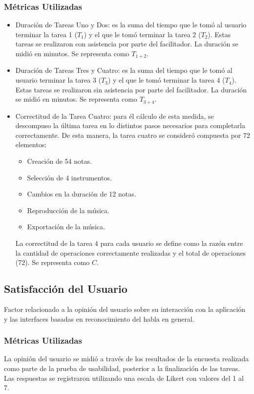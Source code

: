 \subsubsection{M\'etricas Utilizadas}
\begin{itemize}
	\item Duraci\'on de Tareas Uno y Dos: es la suma del tiempo que le tom\'o al usuario
	terminar la tarea 1 ($T_1$) y el que le tom\'o terminar la tarea 2 ($T_2$). 
	Estas tareas se realizaron con asistencia por parte del facilitador. 
	La duraci\'on se midi\'o en minutos. Se representa como $T_{1+2}$.
	\item Duraci\'on de Tareas Tres y Cuatro: es la suma del tiempo que le tom\'o al usuario
	terminar la tarea 3 ($T_3$) y el que le tom\'o terminar la tarea 4 ($T_4$). 
	Estas tareas se realizaron sin asistencia por parte del facilitador. 
	La duraci\'on se midi\'o en minutos. Se representa como $T_{3+4}$.
	\item Correctitud de la Tarea Cuatro: para \'el c\'alculo de esta medida, se descompuso la
	\'ultima tarea en lo distintos pasos necesarios para completarla correctamente.
	De esta manera, la tarea cuatro se consider\'o compuesta por 72 elementos:
	\begin{itemize}
		\item Creaci\'on de 54 notas.
		\item Selecci\'on de 4 instrumentos.
		\item Cambios en la duraci\'on de 12 notas.
		\item Reproducci\'on de la m\'usica.
		\item Exportaci\'on de la m\'usica.
	\end{itemize}
	La correctitud de la tarea 4 para cada usuario se define como la raz\'on entre la cantidad de operaciones
	correctamente realizadas y el total de operaciones (72). Se representa como $C$.
\end{itemize}

\subsection{Satisfacci\'on del Usuario}
Factor relacionado a la opini\'on del usuario sobre su interacci\'on con la aplicaci\'on y las interfaces
basadas en reconocimiento del habla en general.
\subsubsection{M\'etricas Utilizadas}
La opini\'on del usuario se midi\'o a trav\'es de los resultados de la encuesta realizada como parte de
la prueba de usabilidad, posterior a la finalizaci\'on de las tareas. Las respuestas se
registraron utilizando una escala de Likert \cite{Allen:2007} con valores del 1 al 7.


